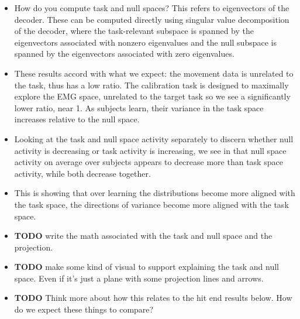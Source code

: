 \documentclass[../main.tex]{subfiles}
\begin{document}
\begin{itemize}
  \item How do you compute task and null spaces? This refers to eigenvectors of the decoder. These can be computed directly using singular value decomposition of the decoder, where the task-relevant subspace is spanned by the eigenvectors associated with nonzero eigenvalues and the null subspace is spanned by the eigenvectors associated with zero eigenvalues.
  \item These results accord with what we expect: the movement data is unrelated to the task, thus has a low ratio. The calibration task is designed to maximally explore the EMG space, unrelated to the target task so we see a significantly lower ratio, near 1. As subjects learn, their variance in the task space increases relative to the null space.
  \item Looking at the task and null space activity separately to discern whether null activity is decreasing or task activity is increasing, we see in  that null space activity on average over subjects appears to decrease more than task space activity, while both decrease together.
  \item This is showing that over learning the distributions become more aligned with the task space, the directions of variance become more aligned with the task space.
  \item \textbf{TODO} write the math associated with the task and null space and the projection. 
  \item \textbf{TODO} make some kind of visual to support explaining the task and null space. Even if it's just a plane with some projection lines and arrows.
  \item \textbf{TODO} Think more about how this relates to the hit end results below. How do we expect these things to compare?
\end{itemize}
 

\end{document}
